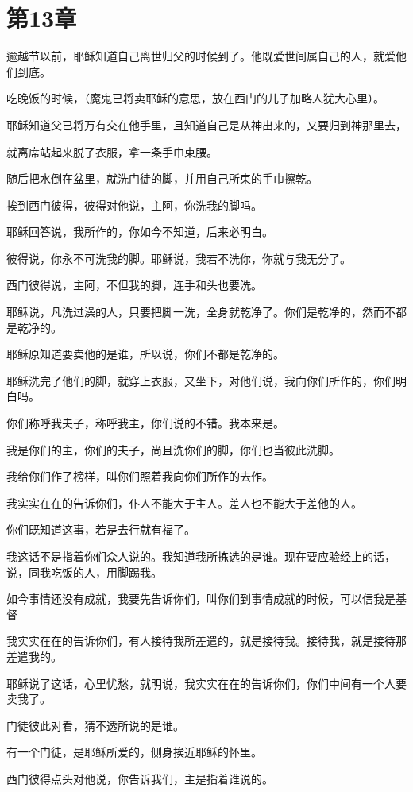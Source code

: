 \documentclass[12pt,oneside]{book}
\begin{document}
\chapter{第13章}
逾越节以前，耶稣知道自己离世归父的时候到了。他既爱世间属自己的人，就爱他们到底。

吃晚饭的时候，（魔鬼已将卖耶稣的意思，放在西门的儿子加略人犹大心里）。

耶稣知道父已将万有交在他手里，且知道自己是从神出来的，又要归到神那里去，

就离席站起来脱了衣服，拿一条手巾束腰。

随后把水倒在盆里，就洗门徒的脚，并用自己所束的手巾擦乾。

挨到西门彼得，彼得对他说，主阿，你洗我的脚吗。

耶稣回答说，我所作的，你如今不知道，后来必明白。

彼得说，你永不可洗我的脚。耶稣说，我若不洗你，你就与我无分了。

西门彼得说，主阿，不但我的脚，连手和头也要洗。

耶稣说，凡洗过澡的人，只要把脚一洗，全身就乾净了。你们是乾净的，然而不都是乾净的。

耶稣原知道要卖他的是谁，所以说，你们不都是乾净的。

耶稣洗完了他们的脚，就穿上衣服，又坐下，对他们说，我向你们所作的，你们明白吗。

你们称呼我夫子，称呼我主，你们说的不错。我本来是。

我是你们的主，你们的夫子，尚且洗你们的脚，你们也当彼此洗脚。

我给你们作了榜样，叫你们照着我向你们所作的去作。

我实实在在的告诉你们，仆人不能大于主人。差人也不能大于差他的人。

你们既知道这事，若是去行就有福了。

我这话不是指着你们众人说的。我知道我所拣选的是谁。现在要应验经上的话，说，同我吃饭的人，用脚踢我。

如今事情还没有成就，我要先告诉你们，叫你们到事情成就的时候，可以信我是基督

我实实在在的告诉你们，有人接待我所差遣的，就是接待我。接待我，就是接待那差遣我的。

耶稣说了这话，心里忧愁，就明说，我实实在在的告诉你们，你们中间有一个人要卖我了。

门徒彼此对看，猜不透所说的是谁。

有一个门徒，是耶稣所爱的，侧身挨近耶稣的怀里。

西门彼得点头对他说，你告诉我们，主是指着谁说的。
\end{document}
